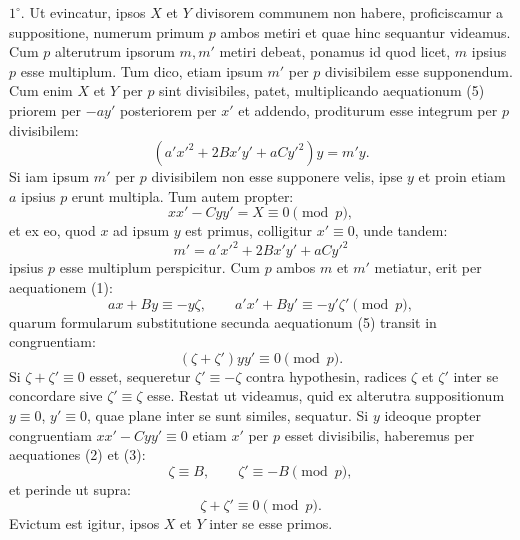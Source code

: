 \documentclass[11pt]{article}
\begin{document}
$1^\circ$. Ut evincatur, ipsos $X$ et $Y$ divisorem communem non habere, proficiscamur a suppositione, numerum primum $p$ ambos metiri et quae hinc sequantur videamus. Cum $p$ alterutrum ipsorum $m,m'$ metiri debeat, ponamus id quod licet, $m$ ipsius $p$ esse multiplum. Tum dico, etiam ipsum $m'$ per $p$ divisibilem esse supponendum. Cum enim $X$ et $Y$ per $p$ sint divisibiles, patet, multiplicando aequationum (5) priorem per $-ay'$ posteriorem per $x'$ et addendo, proditurum esse integrum per $p$ divisibilem:
\[
 (a'x'^2+2Bx'y'+aCy'^2)y=m'y.
\]
Si iam ipsum $m'$ per $p$ divisibilem non esse supponere velis, ipse $y$ et proin etiam $a$ ipsius $p$ erunt multipla. Tum autem propter:
\[
 xx'-Cyy'=X\equiv0\pmod p,
\]
et ex eo, quod $x$ ad ipsum $y$ est primus, colligitur $x'\equiv0$, unde tandem:
\[
 m'=a'x'^2+2Bx'y'+aCy'^2
\]
ipsius $p$ esse multiplum perspicitur. Cum $p$ ambos $m$ et $m'$ metiatur, erit per aequationem (1):
\[
 ax+By\equiv -y\zeta,\qquad a'x'+By'\equiv -y'\zeta'\pmod p,
\]
quarum formularum substitutione secunda aequationum (5) transit in congruentiam:
\[
 (\zeta+\zeta')yy'\equiv0\pmod p.
\]
Si $\zeta+\zeta'\equiv0$ esset, sequeretur $\zeta'\equiv-\zeta$ contra hypothesin, radices $\zeta$ et $\zeta'$ inter se concordare sive $\zeta'\equiv\zeta$ esse. Restat ut videamus, quid ex alterutra suppositionum $y\equiv0$, $y'\equiv0$, quae plane inter se sunt similes, sequatur. Si $y$ ideoque propter congruentiam $xx'-Cyy'\equiv0$ etiam $x'$ per $p$ esset divisibilis, haberemus per aequationes (2) et (3):
\[
 \zeta\equiv B,
 \qquad \zeta'\equiv -B\pmod p,
\]
et perinde ut supra:
\[
 \zeta+\zeta'\equiv0\pmod p.
\]
Evictum est igitur, ipsos $X$ et $Y$ inter se esse primos.
\end{document}
